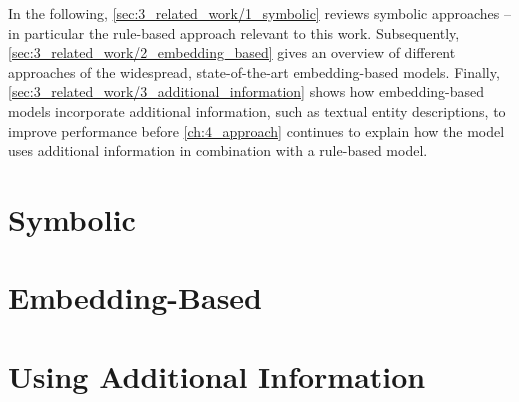 In the following, \autoref{sec:3_related_work/1_symbolic} reviews symbolic approaches -- in particular the rule-based approach relevant to this work. Subsequently, \autoref{sec:3_related_work/2_embedding_based} gives an overview of different approaches of the widespread, state-of-the-art embedding-based models. Finally, \autoref{sec:3_related_work/3_additional_information} shows how embedding-based models incorporate additional information, such as textual entity descriptions, to improve performance before \autoref{ch:4_approach} continues to explain how the model uses additional information in combination with a rule-based model.


\section{Symbolic}
\label{sec:3_related_work/1_symbolic}



\section{Embedding-Based}
\label{sec:3_related_work/2_embedding_based}



\section{Using Additional Information}
\label{sec:3_related_work/3_additional_information}

